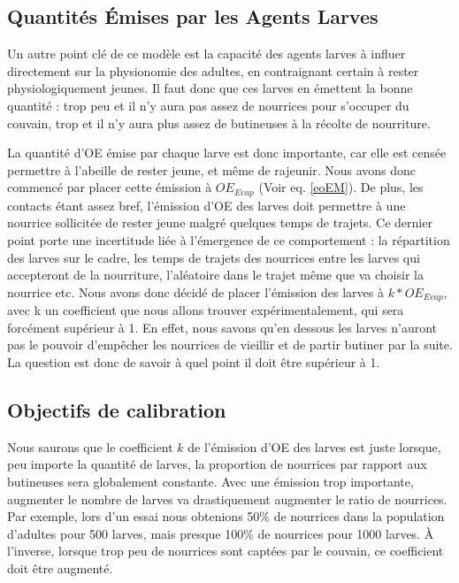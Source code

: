 	
	
	\subsection{Quantités Émises par les Agents Larves}
	\label{subsesctionPHLarves}
	Un autre point clé de ce modèle est la capacité des agents larves à influer directement sur la physionomie des adultes, en contraignant certain à rester physiologiquement jeunes. Il faut donc que ces larves en émettent la bonne quantité : trop peu et il n'y aura pas assez de nourrices pour s'occuper du couvain, trop et il n'y aura plus assez de butineuses à la récolte de nourriture.
	
	La quantité d'OE émise par chaque larve est donc importante, car elle est censée permettre à l'abeille de rester jeune, et même de rajeunir. Nous avons donc commencé par placer cette émission à $OE_{Evap}$ (Voir eq. \ref{eoEM}). De plus, les contacts étant assez bref, l'émission d'OE des larves doit permettre à une nourrice sollicitée de rester jeune malgré quelques temps de trajets. Ce dernier point porte une incertitude liée à l'émergence de ce comportement : la répartition des larves sur le cadre, les temps de trajets des nourrices entre les larves qui accepteront de la nourriture, l'aléatoire dans le trajet même que va choisir la nourrice etc. Nous avons donc décidé de placer l'émission des larves à $k * OE_{Evap}$, avec k un coefficient que nous allons trouver expérimentalement, qui sera forcément supérieur à 1. En effet, nous savons qu'en dessous les larves n'auront pas le pouvoir d'empêcher les nourrices de vieillir et de partir butiner par la suite. La question est donc de savoir à quel point il doit être supérieur à 1.
	
	\subsection{Objectifs de calibration}
	\label{subsectionObjectifCalibration}
	Nous saurons que le coefficient $k$ de l'émission d'OE des larves est juste lorsque, peu importe la quantité de larves, la proportion de nourrices par rapport aux butineuses sera globalement constante. Avec une émission trop importante, augmenter le nombre de larves va drastiquement augmenter le ratio de nourrices. Par exemple, lors d'un essai nous obtenions 50\% de nourrices dans la population d'adultes pour 500 larves, mais presque 100\% de nourrices pour 1000 larves. À l'inverse, lorsque trop peu de nourrices sont captées par le couvain, ce coefficient doit être augmenté.
	

